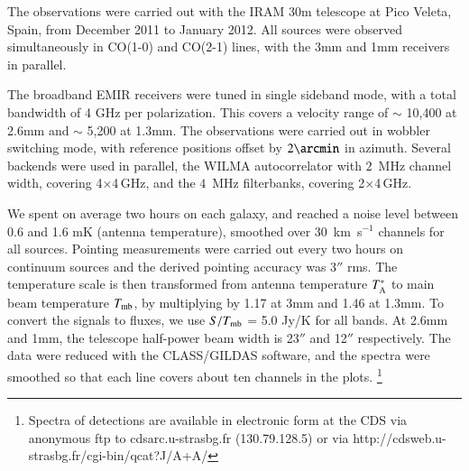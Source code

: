 \documentclass[traditabstract]{aa}
\def\ts     {\thinspace}
\def\kms    {\ifmmode{{\rm \ts km\ts s}^{-1}}\else{\ts km\ts s$^{-1}$}\fi}
\begin{document}
The observations were carried out with the IRAM 30m telescope
at Pico Veleta, Spain, from December 2011 to January 2012.
All sources were observed simultaneously in CO(1-0) and
CO(2-1) lines, with the 3mm and 1mm receivers in parallel.

The broadband EMIR receivers were tuned in single sideband mode,
with a total bandwidth of 4 GHz per polarization. This covers a velocity range
of $\sim$ 10,400 \kms at 2.6mm and $\sim$ 5,200 \kms at 1.3mm.  The
observations were carried out in wobbler switching mode, with reference
positions offset by $2\arcmin$ in azimuth. Several backends were used in parallel,
the WILMA autocorrelator with  $2$~MHz channel width, covering 4$\times$4\,GHz,
and the $4$~MHz filterbanks, covering 2$\times$4\,GHz.

We spent on average two hours on each galaxy, and reached
a noise level between 0.6 and 1.6 mK (antenna temperature), smoothed
over  $30$~km~s$^{-1}$ channels for all sources. 
Pointing measurements were carried out every two hours on continuum sources and
the derived pointing accuracy was 3$''$ rms.  The temperature scale is then
transformed from antenna temperature  $T_{\rm A}^*$ to main
beam temperature $T_{\rm mb}$, by multiplying by 1.17 at 3mm and 1.46 at 1.3mm. 
To convert the signals to fluxes, we use $S/T_{\rm mb}$ = 5.0 Jy/K for all bands. 
At 2.6mm and 1mm, the telescope half-power beam
width is 23$''$ and 12$''$ respectively. 
The data were reduced with the CLASS/GILDAS software, and
the spectra were smoothed so that each line covers about ten channels in the plots.
\footnote{Spectra of detections are available in electronic form
at the CDS via anonymous ftp to cdsarc.u-strasbg.fr (130.79.128.5)
or via http://cdsweb.u-strasbg.fr/cgi-bin/qcat?J/A+A/
}
\end{document}
